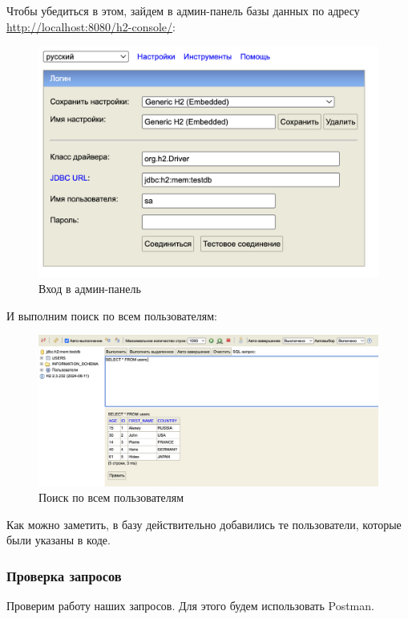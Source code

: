 \documentclass[a4paper, 14pt]{article}
\begin{document}
Чтобы убедиться в этом, зайдем в админ-панель базы данных по адресу \url{http://localhost:8080/h2-console/}:

\begin{figure}[H]
	\centering
	\includegraphics[width=15cm]{resources/3.png}
	\caption{Вход в админ-панель}
\end{figure}

И выполним поиск по всем пользователям:

\begin{figure}[H]
	\centering
	\includegraphics[width=15cm]{resources/4.png}
	\caption{Поиск по всем пользователям}
\end{figure}

Как можно заметить, в базу действительно добавились те пользователи, которые были указаны в коде.

\subsubsection{Проверка запросов}

Проверим работу наших запросов. Для этого будем использовать Postman.
\end{document}
